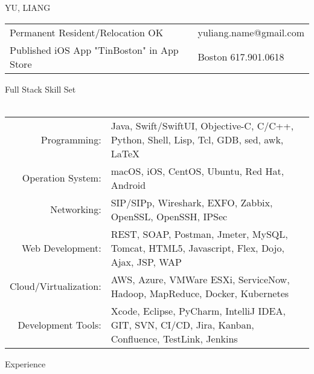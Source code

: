 \documentclass[10pt]{article}
\newcommand{\lineunder}{\vspace*{-8pt}\\\hspace*{-18pt}\hrulefill\\}
\newcommand{\header}[1]{{\hspace*{-15pt}\vspace*{6pt}\LARGE{{#1}}}\vspace*{-6pt}\lineunder}
\begin{document}
\pagestyle{CVfooter}

\vspace*{-40pt}
\begin{center}
{\LARGE \scshape {YU, LIANG}}
\end{center}



\begin{center}

\begin{tabular}{l l}
\small{Permanent Resident/Relocation OK}    & \small{yuliang.name@gmail.com} \\
\small{Published iOS App "TinBoston" in App Store}         & \small{Boston 617.901.0618} \\
\end{tabular}

\end{center}



\header{Full Stack Skill Set}

\begin{tabular}{r l}

Programming: & Java, Swift/SwiftUI, Objective-C, C/C++, Python, Shell, Lisp, Tcl, GDB, sed, awk, \LaTeX \\
Operation System: & macOS, iOS, CentOS, Ubuntu, Red Hat, Android \\
Networking: & SIP/SIPp, Wireshark, EXFO, Zabbix, OpenSSL, OpenSSH, IPSec \\
Web Development: & REST, SOAP, Postman, Jmeter, MySQL, Tomcat,  HTML5, Javascript, Flex, Dojo, Ajax, JSP, WAP \\
Cloud/Virtualization: & AWS, Azure, VMWare ESXi, ServiceNow, Hadoop, MapReduce, Docker, Kubernetes \\
Development Tools: & Xcode, Eclipse, PyCharm, IntelliJ IDEA, GIT, SVN, CI/CD, Jira, Kanban, Confluence, TestLink, Jenkins \\

\end{tabular}

\vspace*{10pt}


\header{Experience}
\end{document}
